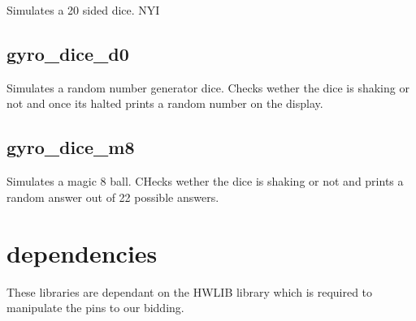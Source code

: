 Simulates a 20 sided dice. N\+YI \hypertarget{index_gyro_dice_d0}{}\subsection{gyro\+\_\+dice\+\_\+d0}\label{index_gyro_dice_d0}
Simulates a random number generator dice. Checks wether the dice is shaking or not and once its halted prints a random number on the display. \hypertarget{index_gyro_dice_m8}{}\subsection{gyro\+\_\+dice\+\_\+m8}\label{index_gyro_dice_m8}
Simulates a magic 8 ball. C\+Hecks wether the dice is shaking or not and prints a random answer out of 22 possible answers.\hypertarget{index_dependencies}{}\section{dependencies}\label{index_dependencies}
These libraries are dependant on the H\+W\+L\+IB library which is required to manipulate the pins to our bidding. 